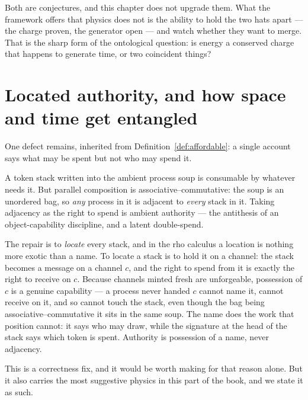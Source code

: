 Both are conjectures, and this chapter does not upgrade them.  What the
framework offers that physics does not is the ability to hold the two
hats apart --- the charge proven, the generator open --- and watch whether
they want to merge.  That is the sharp form of the ontological question:
is energy a conserved charge that happens to generate time, or two
coincident things?

\section{Located authority, and how space and time get entangled}

One defect remains, inherited from Definition~\ref{def:affordable}: a
single account says what may be spent but not who may spend it.

\begin{remark}
\label{rmk:ambient}
A token stack written into the ambient process soup is consumable by
whatever needs it.  But parallel composition is
associative--commutative: the soup is an unordered bag, so \emph{any}
process in it is adjacent to \emph{every} stack in it.  Taking adjacency
as the right to spend is ambient authority --- the antithesis of an
object-capability discipline, and a latent double-spend.
\end{remark}

The repair is to \emph{locate} every stack, and in the rho calculus a
location is nothing more exotic than a name.  To locate a stack is to hold
it on a channel: the stack becomes a message on a channel $c$, and the
right to spend from it is exactly the right to receive on $c$.  Because
channels minted fresh are unforgeable, possession of $c$ is a genuine
capability --- a process never handed $c$ cannot name it, cannot receive on
it, and so cannot touch the stack, even though the bag being
associative--commutative it sits in the same soup.  The name does the work
that position cannot: it says who may draw, while the signature at the
head of the stack says which token is spent.  Authority is possession of a
name, never adjacency.

This is a correctness fix, and it would be worth making for that reason
alone.  But it also carries the most suggestive physics in this part of
the book, and we state it as such.

